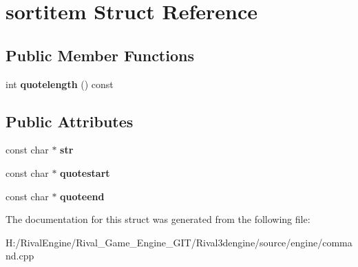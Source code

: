 \hypertarget{structsortitem}{}\section{sortitem Struct Reference}
\label{structsortitem}
\subsection*{Public Member Functions}
\begin{DoxyCompactItemize}
\item 
\mbox{\label{structsortitem_acf26208a5b969250fd6841d02403b8a4}} 
int {\bfseries quotelength} () const
\end{DoxyCompactItemize}
\subsection*{Public Attributes}
\begin{DoxyCompactItemize}
\item 
\mbox{\label{structsortitem_a345b3635bc2a2d939252f19e8a477e4a}} 
const char $\ast$ {\bfseries str}
\item 
\mbox{\label{structsortitem_aba1f6d75c54d19fd1df115790f8cbdcc}} 
const char $\ast$ {\bfseries quotestart}
\item 
\mbox{\label{structsortitem_aac3126c92827cc568dec7ea72db54969}} 
const char $\ast$ {\bfseries quoteend}
\end{DoxyCompactItemize}


The documentation for this struct was generated from the following file\+:\begin{DoxyCompactItemize}
\item 
H\+:/\+Rival\+Engine/\+Rival\+\_\+\+Game\+\_\+\+Engine\+\_\+\+G\+I\+T/\+Rival3dengine/source/engine/command.\+cpp\end{DoxyCompactItemize}
